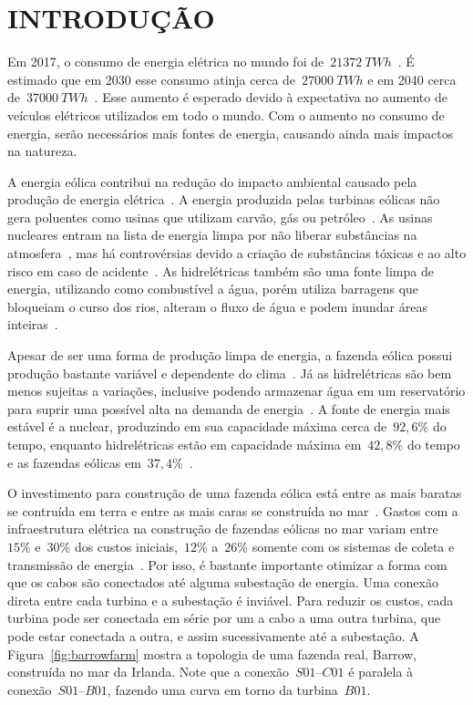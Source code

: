 \chapter{INTRODUÇÃO}\label{chap:1}

Em 2017, o consumo de energia elétrica no mundo foi de~$21372\ TWh$~\cite{iea-consumo2017}.
É estimado que em 2030 esse consumo atinja cerca de~$27000\ TWh$ e em 2040 cerca de~$37000\ TWh$~\cite{iea2000-2040}.
Esse aumento é esperado devido à expectativa no aumento de veículos elétricos utilizados em todo o mundo.
Com o aumento no consumo de energia, serão necessários mais fontes de energia, causando ainda mais impactos na natureza.

A energia eólica contribui na redução do impacto ambiental causado pela produção de energia elétrica~\cite{cazzaro2019}.
A energia produzida pelas turbinas eólicas não gera poluentes como usinas que utilizam carvão, gás ou petróleo~\cite{saidur2011}.
As usinas nucleares entram na lista de energia limpa por não liberar substâncias na atmosfera~\cite{sadekin2019}, mas há controvérsias devido a criação de substâncias tóxicas e ao alto risco em caso de acidente~\cite{nirs2011, greenpeace2017}.
As hidrelétricas também são uma fonte limpa de energia, utilizando como combustível a água, porém utiliza barragens que bloqueiam o curso dos rios, alteram o fluxo de água e podem inundar áreas inteiras~\cite{koontz2015}.

Apesar de ser uma forma de produção limpa de energia, a fazenda eólica possui produção bastante variável e dependente do clima~\cite{fantidis2012}.
Já as hidrelétricas são bem menos sujeitas a variações, inclusive podendo armazenar água em um reservatório para suprir uma possível alta na demanda de energia~\cite{folk2018}.
A fonte de energia mais estável é a nuclear, produzindo em sua capacidade máxima cerca de~$92,6\%$ do tempo, enquanto hidrelétricas estão em capacidade máxima em~$42,8\%$ do tempo e as fazendas eólicas em~$37,4\%$~\cite{rone2018}.

O investimento para construção de uma fazenda eólica está entre as mais baratas se contruída em terra e entre as mais caras se construída no mar~\cite{eia2020}.
Gastos com a infraestrutura elétrica na construção de fazendas eólicas no mar variam entre~$15\%$ e~$30\%$ dos custos iniciais,~$12\%$ a~$26\%$ somente com os sistemas de coleta e transmissão de energia~\cite{gonzalez2014}.
Por isso, é bastante importante otimizar a forma com que os cabos são conectados até alguma subestação de energia.
Uma conexão direta entre cada turbina e a subestação é inviável.
Para reduzir os custos, cada turbina pode ser conectada em série por um a cabo a uma outra turbina, que pode estar conectada a outra, e assim sucessivamente até a subestação.
A Figura~\ref{fig:barrowfarm} mostra a topologia de uma fazenda real, Barrow, construída no mar da Irlanda.
Note que a conexão~$S01$--$C01$ é paralela à conexão~$S01$--$B01$, fazendo uma curva em torno da turbina~$B01$.

